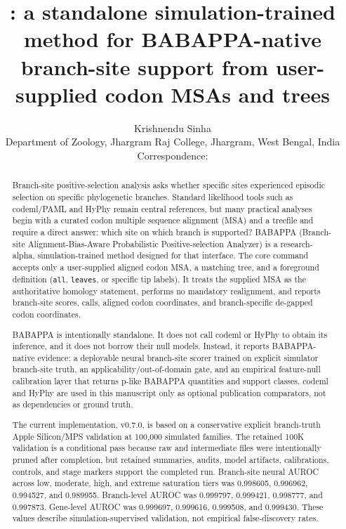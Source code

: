 \documentclass[11pt,a4paper]{article}
\title{\textbf{\ProjectName}: a standalone simulation-trained method for BABAPPA-native branch-site support from user-supplied codon MSAs and trees}
\author{
Krishnendu Sinha\\
\small Department of Zoology, Jhargram Raj College, Jhargram, West Bengal, India\\
\small Correspondence: \texttt{\CorrespondenceEmail}
}
\date{}
\newcommand{\ProjectName}{BABAPPA}
\newcommand{\ProjectExpansion}{Branch-site Alignment-Bias-Aware Probabilistic Positive-selection Analyzer}
\newcommand{\ProjectVersion}{v0.7.0}
\begin{document}
\maketitle

\begin{abstract}
Branch-site positive-selection analysis asks whether specific sites experienced episodic selection on specific phylogenetic branches. Standard likelihood tools such as codeml/PAML and HyPhy remain central references, but many practical analyses begin with a curated codon multiple sequence alignment (MSA) and a treefile and require a direct answer: which site on which branch is supported? \ProjectName{} (\ProjectExpansion{}) is a research-alpha, simulation-trained method designed for that interface. The core command accepts only a user-supplied aligned codon MSA, a matching tree, and a foreground definition (\texttt{all}, \texttt{leaves}, or specific tip labels). It treats the supplied MSA as the authoritative homology statement, performs no mandatory realignment, and reports branch-site scores, calls, aligned codon coordinates, and branch-specific de-gapped codon coordinates.

BABAPPA is intentionally standalone. It does not call codeml or HyPhy to obtain its inference, and it does not borrow their null models. Instead, it reports BABAPPA-native evidence: a deployable neural branch-site scorer trained on explicit simulator branch-site truth, an applicability/out-of-domain gate, and an empirical feature-null calibration layer that returns p-like BABAPPA quantities and support classes. codeml and HyPhy are used in this manuscript only as optional publication comparators, not as dependencies or ground truth.

The current implementation, \ProjectVersion{}, is based on a conservative explicit branch-truth Apple Silicon/MPS validation at 100,000 simulated families. The retained 100K validation is a conditional pass because raw and intermediate files were intentionally pruned after completion, but retained summaries, audits, model artifacts, calibrations, controls, and stage markers support the completed run. Branch-site neural AUROC across low, moderate, high, and extreme saturation tiers was 0.998605, 0.996962, 0.994527, and 0.989955. Branch-level AUROC was 0.999797, 0.999421, 0.998777, and 0.997873. Gene-level AUROC was 0.999697, 0.999616, 0.999508, and 0.999430. These values describe simulation-supervised validation, not empirical false-discovery rates.


\end{abstract}
\end{document}
